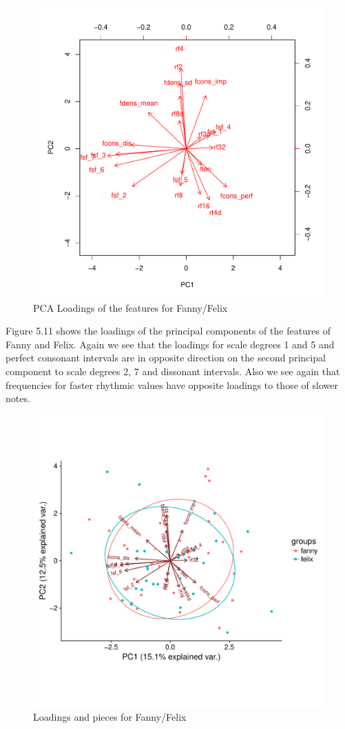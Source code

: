 \documentclass[12pt,twoside]{reedthesis}
\theoremstyle{definition}
\theoremstyle{definition}
\theoremstyle{definition}
\theoremstyle{remark}
\begin{document}
\begin{figure}[h]
\centering
\includegraphics[scale = .5]{images/biplot_f.pdf}
\caption{PCA Loadings of the features for Fanny/Felix}
\label{subd}
\end{figure}
Figure 5.11 shows the loadings of the principal components of the
features of Fanny and Felix. Again we see that the loadings for scale
degrees 1 and 5 and perfect consonant intervals are in opposite
direction on the second principal component to scale degrees 2, 7 and
dissonant intervals. Also we see again that frequencies for faster
rhythmic values have opposite loadings to those of slower notes.
\begin{figure}[H]
\centering
\includegraphics[scale = .5]{images/bi_elipse_12_f.pdf}
\caption{Loadings and pieces for Fanny/Felix}
\label{subd}
\end{figure}
\end{document}

